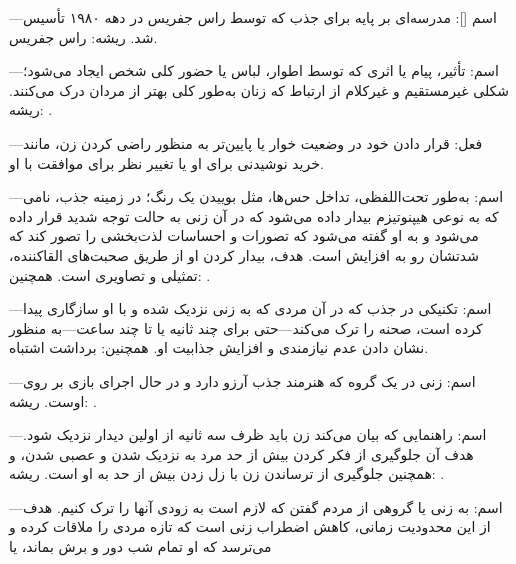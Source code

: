 —اسم []: مدرسه‌ای بر پایه  برای جذب که توسط راس جفریس در دهه ۱۹۸۰ تأسیس شد. ریشه: راس جفریس.

—اسم: تأثیر، پیام یا اثری که توسط اطوار، لباس یا حضور کلی شخص ایجاد می‌شود؛ شکلی غیرمستقیم و غیرکلام از ارتباط که زنان به‌طور کلی بهتر از مردان درک می‌کنند. ریشه: .

—فعل: قرار دادن خود در وضعیت خوار یا پایین‌تر به منظور راضی کردن زن، مانند خرید نوشیدنی برای او یا تغییر نظر برای موافقت با او.

—اسم: به‌طور تحت‌اللفظی، تداخل حس‌ها، مثل بوییدن یک رنگ؛ در زمینه جذب، نامی که به نوعی هیپنوتیزم بیدار داده می‌شود که در آن زنی به حالت توجه شدید قرار داده می‌شود و به او گفته می‌شود که تصورات و احساسات لذت‌بخشی را تصور کند که شدتشان رو به افزایش است. هدف، بیدار کردن او از طریق صحبت‌های القاکننده، تمثیلی و تصاویری است. همچنین: .

—اسم: تکنیکی در جذب که در آن مردی که به زنی نزدیک شده و با او سازگاری پیدا کرده است، صحنه را ترک می‌کند—حتی برای چند ثانیه یا تا چند ساعت—به منظور نشان دادن عدم نیازمندی و افزایش جذابیت او. همچنین: برداشت اشتباه.

—اسم: زنی در یک گروه که هنرمند جذب آرزو دارد و در حال اجرای بازی بر روی اوست. ریشه: .

—اسم: راهنمایی که بیان می‌کند زن باید ظرف سه ثانیه از اولین دیدار نزدیک شود. هدف آن جلوگیری از فکر کردن بیش از حد مرد به نزدیک شدن و عصبی شدن، و همچنین جلوگیری از ترساندن زن با زل زدن بیش از حد به او است. ریشه: .

—اسم: به زنی یا گروهی از مردم گفتن که لازم است به زودی آنها را ترک کنیم. هدف از این محدودیت زمانی، کاهش اضطراب زنی است که تازه مردی را ملاقات کرده و می‌ترسد که او تمام شب دور و برش بماند، یا